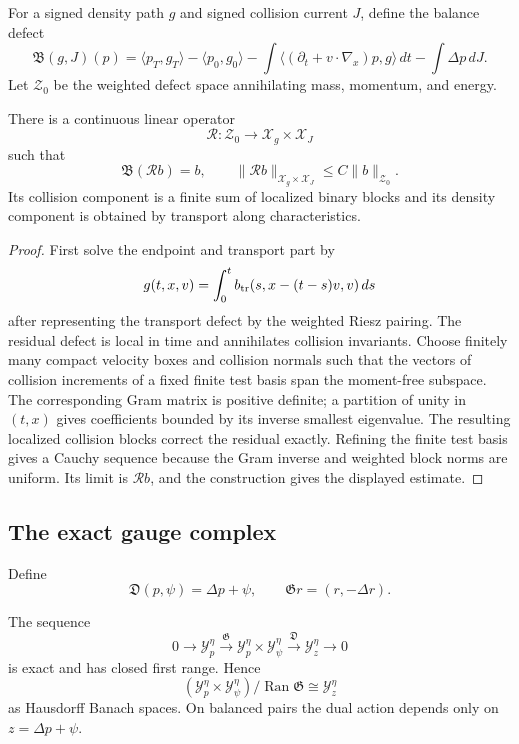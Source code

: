 For a signed density path \(g\) and signed collision current \(J\), define
the balance defect
\[
 {\mathfrak B}(g,J)(p)
 =
 \langle p_T,g_T\rangle-\langle p_0,g_0\rangle
 -\int\langle(\partial_t+v\cdot\nabla_x)p,g\rangle\,dt
 -\int\Delta p\,dJ.
\]
Let \({\mathcal Z}_0\) be the weighted defect space annihilating mass,
momentum, and energy.

\begin{theorem}
\label{thm:r5-b3-right-inverse}
There is a continuous linear operator
\[
 {\mathcal R}:{\mathcal Z}_0
 \longrightarrow
 {\mathcal X}_g\times{\mathcal X}_J
\]
such that
\[
 {\mathfrak B}({\mathcal R}b)=b,\qquad
 \|{\mathcal R}b\|_{{\mathcal X}_g\times{\mathcal X}_J}
 \le C\|b\|_{{\mathcal Z}_0}.
\]
Its collision component is a finite sum of localized binary blocks and its
density component is obtained by transport along characteristics.
\end{theorem}

\begin{proof}
First solve the endpoint and transport part by
\[
 g(t,x,v)=\int_0^t b_{\rm tr}
 (s,x-(t-s)v,v)\,ds
\]
after representing the transport defect by the weighted Riesz pairing.
The residual defect is local in time and annihilates collision invariants.
Choose finitely many compact velocity boxes and collision normals such that
the vectors of collision increments of a fixed finite test basis span the
moment-free subspace.  The corresponding Gram matrix is positive definite;
a partition of unity in \((t,x)\) gives coefficients bounded by its inverse
smallest eigenvalue.  The resulting localized collision blocks correct the
residual exactly.  Refining the finite test basis gives a Cauchy sequence
because the Gram inverse and weighted block norms are uniform.  Its limit is
\({\mathcal R}b\), and the construction gives the displayed estimate.
\end{proof}

\subsection{The exact gauge complex}

Define
\[
 {\mathfrak D}(p,\psi)=\Delta p+\psi,
 \qquad
 {\mathfrak G}r=(r,-\Delta r).
\]

\begin{theorem}
\label{thm:r5-b3-gauge}
The sequence
\[
 0\longrightarrow{\mathcal Y}_p^\eta
 \xrightarrow{{\mathfrak G}}
 {\mathcal Y}_p^\eta\times{\mathcal Y}_\psi^\eta
 \xrightarrow{{\mathfrak D}}
 {\mathcal Y}_z^\eta
 \longrightarrow0
\]
is exact and has closed first range.  Hence
\[
 ({\mathcal Y}_p^\eta\times{\mathcal Y}_\psi^\eta)/
 \operatorname{Ran}{\mathfrak G}
 \cong{\mathcal Y}_z^\eta
\]
as Hausdorff Banach spaces.  On balanced pairs the dual action depends only
on \(z=\Delta p+\psi\).
\end{theorem}

